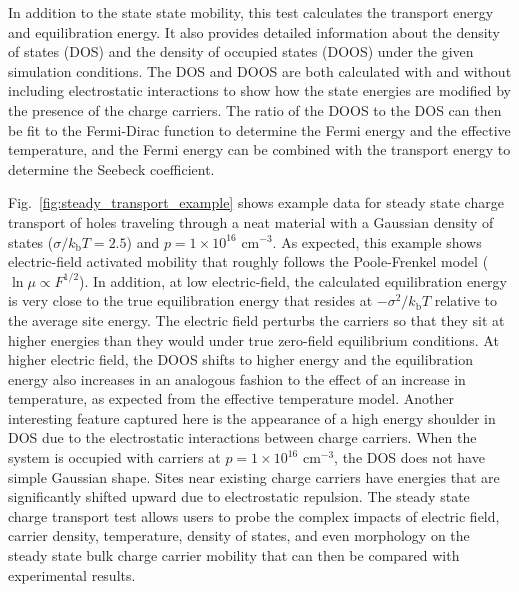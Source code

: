 \documentclass[%
 reprint,onecolumn,notitlepage,
superscriptaddress,longbibliography,
 amsmath,amssymb,
 aps,rmp,floatfix,
]{revtex4-1}
\begin{document}
In addition to the state state mobility, this test calculates the transport energy and equilibration energy. 
It also provides detailed information about the density of states (DOS) and the density of occupied states (DOOS) under the given simulation conditions.
The DOS and DOOS are both calculated with and without including electrostatic interactions to show how the state energies are modified by the presence of the charge carriers.
The ratio of the DOOS to the DOS can then be fit to the Fermi-Dirac function to determine the Fermi energy and the effective temperature, and the Fermi energy can be combined with the transport energy to determine the Seebeck coefficient.\cite{zuo2019aem}

Fig.\ \ref{fig:steady_transport_example} shows example data for steady state charge transport of holes traveling through a neat material with a Gaussian density of states ($\sigma / k_\text{b}T = 2.5$) and $p = 1 \times 10^{16}$ cm$^{-3}$.
As expected, this example shows electric-field activated mobility that roughly follows the Poole-Frenkel model ($\ln\mu\propto F^{1/2}$).
In addition, at low electric-field, the calculated equilibration energy is very close to the true equilibration energy that resides at $-\sigma^2 / k_\text{b}T$ relative to the average site energy. 
The electric field perturbs the carriers so that they sit at higher energies than they would under true zero-field equilibrium conditions.
At higher electric field, the DOOS shifts to higher energy and the equilibration energy also increases in an analogous fashion to the effect of an increase in temperature, as expected from the effective temperature model.\cite{baranovskii2014pssb}
Another interesting feature captured here is the appearance of a high energy shoulder in DOS due to the electrostatic interactions between charge carriers.
When the system is occupied with carriers at $p = 1 \times 10^{16}$ cm$^{-3}$, the DOS does not have simple Gaussian shape.
Sites near existing charge carriers have energies that are significantly shifted upward due to electrostatic repulsion.
The steady state charge transport test allows users to probe the complex impacts of electric field, carrier density, temperature, density of states, and even morphology on the steady state bulk charge carrier mobility that can then be compared with experimental results. 
\end{document}

